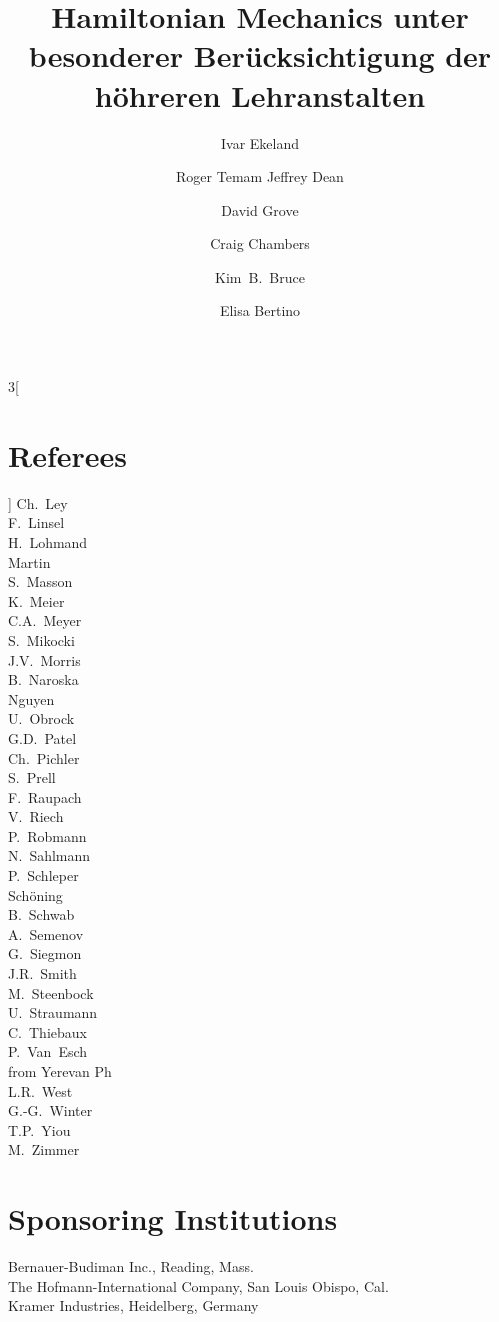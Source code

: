 \documentclass{llncs}
\begin{document}
\begin{multicols}{3}[\section*{Referees}]
Ch.~Ley\\
F.~Linsel\\
H.~Lohmand\\
Martin\\
S.~Masson\\
K.~Meier\\
C.A.~Meyer\\
S.~Mikocki\\
J.V.~Morris\\
B.~Naroska\\
Nguyen\\
U.~Obrock\\
G.D.~Patel\\
Ch.~Pichler\\
S.~Prell\\
F.~Raupach\\
V.~Riech\\
P.~Robmann\\
N.~Sahlmann\\
P.~Schleper\\
Sch\"oning\\
B.~Schwab\\
A.~Semenov\\
G.~Siegmon\\
J.R.~Smith\\
M.~Steenbock\\
U.~Straumann\\
C.~Thiebaux\\
P.~Van~Esch\\
from Yerevan Ph\\
L.R.~West\\
G.-G.~Winter\\
T.P.~Yiou\\
M.~Zimmer\end{multicols}
%
\section*{Sponsoring Institutions}
%
Bernauer-Budiman Inc., Reading, Mass.\\
The Hofmann-International Company, San Louis Obispo, Cal.\\
Kramer Industries, Heidelberg, Germany
%
\tableofcontents
%
\mainmatter              %


\title{Hamiltonian Mechanics unter besonderer Ber\"ucksichtigung der
h\"ohreren Lehranstalten}
%
%
\author{Ivar Ekeland \and Roger Temam
Jeffrey Dean \and David Grove \and Craig Chambers \and Kim~B.~Bruce \and
Elisa Bertino}
%
%
\end{document}
